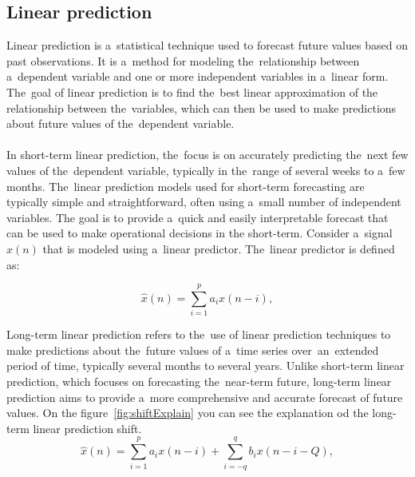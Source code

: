         \subsection{Linear prediction}\label{subsec:lp}
        Linear prediction is a~statistical technique used to forecast future values based on past observations.
        It is a~method for modeling the~relationship between a~dependent variable and one or more independent
        variables in a~linear form. The~goal of linear prediction is to find the~best linear approximation of the
        relationship between the~variables, which can then be used to make predictions about future
        values of the~dependent variable.\\
        \\
        In short-term linear prediction, the~focus is on accurately predicting the~next few values of the~dependent variable,
        typically in the~range of several weeks to a~few months. The~linear prediction models used for short-term
        forecasting are typically simple and straightforward, often using a~small number of independent variables.
        The goal is to provide a~quick and easily interpretable forecast that can be used to make operational decisions in
        the short-term.
        Consider a~signal $x(n)$ that is modeled using a~linear predictor. The~linear predictor is defined as:

        \begin{equation}
        \hat{x}(n) = \sum_{i=1}^{p} a_i x(n-i),
        \label{eq:m-linear-predictor}
        \end{equation}

        Long-term linear prediction refers to the~use of linear prediction techniques to make predictions about the~future
        values of a~time series over~an~extended period of time, typically several months to several years. Unlike short-term
        linear prediction, which focuses on forecasting the~near-term future, long-term linear prediction aims to provide a~more
        comprehensive and accurate forecast of future values. On the figure~\ref{fig:shiftExplain} you can see the explanation od the long-term linear prediction shift.\\
        \begin{equation}\label{eq:ltlp}
            \hat{x}(n) = \sum_{i=1}^{p} a_i x(n-i) + \sum_{i=-q}^{q} b_i x(n-i-Q),
        \end{equation}
        \newpage
